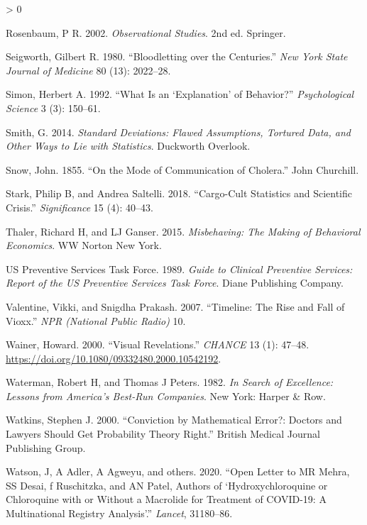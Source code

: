 \documentclass[
  10pt,
  b5paper]{book}
\newlength{\cslhangindent}
\newenvironment{CSLReferences}[2] %
 {%
  \setlength{\parindent}{0pt}
  \ifodd #1 \everypar{\setlength{\hangindent}{\cslhangindent}}\ignorespaces\fi
  \ifnum #2 > 0
  \setlength{\parskip}{#2\baselineskip}
  \fi
 }%
 {}
\begin{document}
\begin{CSLReferences}{1}{0}
\leavevmode\hypertarget{ref-RosBook}{}%
Rosenbaum, P R. 2002. \emph{Observational Studies}. 2nd ed. Springer.

\leavevmode\hypertarget{ref-seigworth1980bloodletting}{}%
Seigworth, Gilbert R. 1980. {``Bloodletting over the Centuries.''} \emph{New York State Journal of Medicine} 80 (13): 2022--28.

\leavevmode\hypertarget{ref-simon1992explanation}{}%
Simon, Herbert A. 1992. {``What Is an {`Explanation'} of Behavior?''} \emph{Psychological Science} 3 (3): 150--61.

\leavevmode\hypertarget{ref-smith-sd}{}%
Smith, G. 2014. \emph{Standard Deviations: Flawed Assumptions, Tortured Data, and Other Ways to Lie with Statistics}. Duckworth Overlook.

\leavevmode\hypertarget{ref-snow1849mode}{}%
Snow, John. 1855. {``On the Mode of Communication of Cholera.''} John Churchill.

\leavevmode\hypertarget{ref-stark2018cargo}{}%
Stark, Philip B, and Andrea Saltelli. 2018. {``Cargo-Cult Statistics and Scientific Crisis.''} \emph{Significance} 15 (4): 40--43.

\leavevmode\hypertarget{ref-thaler2015misbehaving}{}%
Thaler, Richard H, and LJ Ganser. 2015. \emph{Misbehaving: The Making of Behavioral Economics}. WW Norton New York.

\leavevmode\hypertarget{ref-us1989guide}{}%
US Preventive Services Task Force. 1989. \emph{Guide to Clinical Preventive Services: Report of the US Preventive Services Task Force}. Diane Publishing Company.

\leavevmode\hypertarget{ref-valentine2007timeline}{}%
Valentine, Vikki, and Snigdha Prakash. 2007. {``Timeline: The Rise and Fall of Vioxx.''} \emph{NPR (National Public Radio)} 10.

\leavevmode\hypertarget{ref-wainerRegress}{}%
Wainer, Howard. 2000. {``Visual Revelations.''} \emph{CHANCE} 13 (1): 47--48. \url{https://doi.org/10.1080/09332480.2000.10542192}.

\leavevmode\hypertarget{ref-waterman1982search}{}%
Waterman, Robert H, and Thomas J Peters. 1982. \emph{In Search of Excellence: Lessons from America's Best-Run Companies}. New York: Harper \& Row.

\leavevmode\hypertarget{ref-watkins2000conviction}{}%
Watkins, Stephen J. 2000. {``Conviction by Mathematical Error?: Doctors and Lawyers Should Get Probability Theory Right.''} British Medical Journal Publishing Group.

\leavevmode\hypertarget{ref-watson2020open}{}%
Watson, J, A Adler, A Agweyu, and others. 2020. {``Open Letter to MR Mehra, SS Desai, f Ruschitzka, and AN Patel, Authors of {`Hydroxychloroquine or Chloroquine with or Without a Macrolide for Treatment of COVID-19: A Multinational Registry Analysis'}.''} \emph{Lancet}, 31180--86.


\end{CSLReferences}
\end{document}
